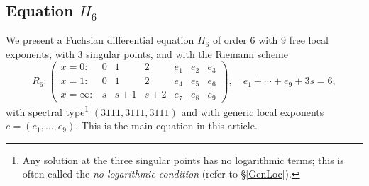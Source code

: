 \documentclass[a4paper,12pt]{article}
\theoremstyle{definition}
\theoremstyle{remark}
\numberwithin{equation}{section} %
\begin{document}
\subsection{Equation $H_6$}\label{E6}
We present a Fuchsian differential equation $H_6$ of order 6 with 9 free
local exponents, with 3 singular points, and with the Riemann scheme
$$R_6:\left(\begin{array}{lcccccc}x=0:&0&1&2&e_1&e_2&e_3\\x=1:&0&1&2&e_4&e_5&e_6\\x=\infty:&s&s+1&s+2&e_7&e_8&e_9\end{array}\right),\quad e_1+\cdots+e_9+3s=6,
  $$
  with spectral type\footnote{Any solution at the three singular points has no logarithmic terms; this is often called the {\sl no-logarithmic condition} (refer to \S \ref{GenLoc}).} $(3111,3111,3111)$ and with generic local exponents $e=(e_1,\dots,e_9)$.
This is the main equation in this article.
 
\end{document}
